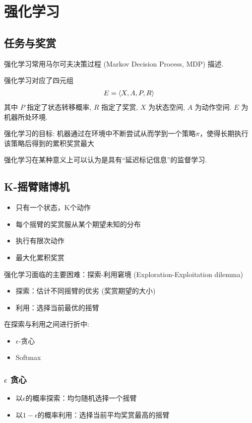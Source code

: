 \newpage
\section{强化学习}
\subsection{任务与奖赏}
强化学习常用马尔可夫决策过程 (Markov Decision Process, MDP) 描述. 

强化学习对应了四元组
\begin{align*}
    E=\braket{X, A, P, R}
\end{align*}
其中 $P$ 指定了状态转移概率, $R$ 指定了奖赏, $X$ 为状态空间, $A$ 为动作空间. $E$ 为机器所处环境. 

强化学习的目标: 机器通过在环境中不断尝试从而学到一个策略$\pi$，使得长期执行该策略后得到的累积奖赏最大


强化学习在某种意义上可以认为是具有“延迟标记信息”的监督学习. 

\subsection{K-摇臂赌博机}
\begin{itemize}
    \item 只有一个状态，K个动作
    \item 每个摇臂的奖赏服从某个期望未知的分布
    \item 执行有限次动作
    \item 最大化累积奖赏
\end{itemize}

强化学习面临的主要困难：探索-利用窘境 (Exploration-Exploitation dilemma)
\begin{itemize}
    \item 探索：估计不同摇臂的优劣 (奖赏期望的大小)
    \item 利用：选择当前最优的摇臂
\end{itemize}

在探索与利用之间进行折中:
\begin{itemize}
    \item $\epsilon$-贪心
    \item Softmax
\end{itemize}

\subsubsection{\texorpdfstring{$\epsilon$}. 贪心}
\begin{itemize}
    \item 以$\epsilon$的概率探索：均匀随机选择一个摇臂
    \item 以$1-\epsilon$的概率利用：选择当前平均奖赏最高的摇臂
\end{itemize}

